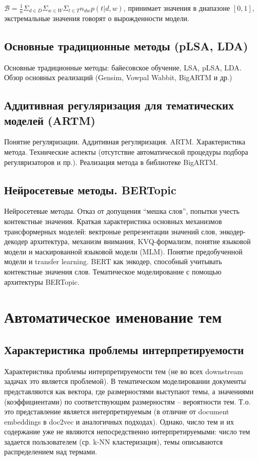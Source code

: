 $\mathcal{B} = \frac{1}{n}\Sigma_{d \in D}\Sigma_{w \in W}\Sigma_{t \in T}n_{dw}p(t|d,w)$, принимает значения в диапазоне $[0, 1]$, экстремальные значения говорят о вырожденности модели.


\section{Основные традиционные методы (pLSA, LDA)}

Основные традиционные методы: байесовское обучение, LSA, pLSA, LDA. Обзор основных реализаций (Gensim, Vowpal Wabbit, BigARTM и др.)

\section{Аддитивная регуляризация для тематических моделей (ARTM)}

Понятие регуляризации. Аддитивная регуляризация. ARTM. Характеристика метода. Технические аспекты (отсутствие автоматической процедуры подбора регуляризаторов и пр.). Реализация метода в библиотеке BigARTM.

\section{Нейросетевые методы. BERTopic}

Нейросетевые методы. Отказ от допущения ``мешка слов'', попытки учесть контекстные значения. Краткая характеристика основных механизмов трансформерных моделей: вектроные репрезентации значений слов, энкодер-декодер архитектура, механизм внимания, KVQ-формализм, понятие языковой модели и маскированной языковой модели (MLM). Понятие предобученной модели и transfer learning. BERT как энкодер, способный учитывать контекстные значения слов. Тематическое моделирование с помощью архитектуры BERTopic.




\chapter{Автоматическое именование тем}

\section{Характеристика проблемы интерпретируемости}

Характеристика проблемы интерпретируемости тем (не во всех downstream задачах это является проблемой). В тематическом моделировании документы представляются как вектора, где размерностями выступают темы, а значениями (коэффициентами) по соответствующим размерностям -- вероятности тем. Т.о. это представление является интерпретируемым (в отличие от document embeddings в doc2vec и аналогичных подходах). Однако, число тем и их содержание уже не являются непосредственно интерпретируемыми: число тем задается пользователем (ср. k-NN кластеризация), темы описываются распределением над термами.

